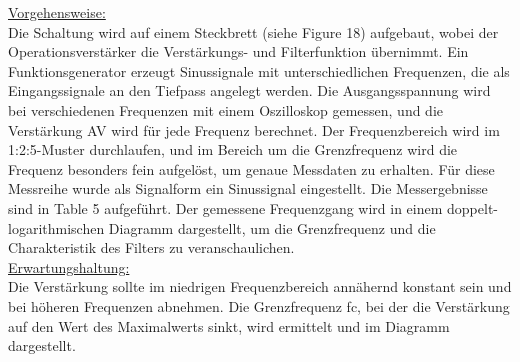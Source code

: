 \documentclass[a4paper,12pt]{article}
\begin{document}
\noindent \underline{Vorgehensweise:}\\
\noindent Die Schaltung wird auf einem Steckbrett (siehe Figure 18) aufgebaut, wobei der Operationsverstärker die Verstärkungs- und Filterfunktion übernimmt.
Ein Funktionsgenerator erzeugt Sinussignale mit unterschiedlichen Frequenzen, die als Eingangssignale an den Tiefpass angelegt werden.
Die Ausgangsspannung wird bei verschiedenen Frequenzen mit einem Oszilloskop gemessen, und die Verstärkung AV wird für jede Frequenz berechnet.
Der Frequenzbereich wird im 1:2:5-Muster durchlaufen, und im Bereich um die Grenzfrequenz wird die Frequenz besonders fein aufgelöst, um genaue Messdaten zu erhalten. Für diese Messreihe wurde als Signalform ein Sinussignal eingestellt. Die Messergebnisse sind in Table 5 aufgeführt.
Der gemessene Frequenzgang wird in einem doppelt-logarithmischen Diagramm dargestellt, um die Grenzfrequenz und die Charakteristik des Filters zu veranschaulichen.\\

\noindent \underline{Erwartungshaltung:}\\
\noindent Die Verstärkung sollte im niedrigen Frequenzbereich annähernd konstant sein und bei höheren Frequenzen abnehmen.
Die Grenzfrequenz fc, bei der die Verstärkung auf den Wert des Maximalwerts sinkt, wird ermittelt und im Diagramm dargestellt.
\end{document}
